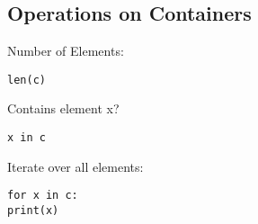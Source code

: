 \subsection{Operations on Containers}
    Number of Elements:
\begin{lstlisting}
len(c)
\end{lstlisting}
    Contains element x?
\begin{lstlisting}
x in c
\end{lstlisting}
Iterate over all elements:
\begin{lstlisting}
for x in c:
print(x)
\end{lstlisting}
